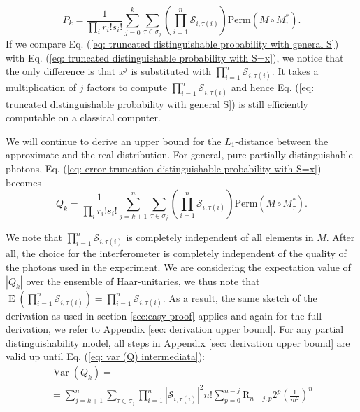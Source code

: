 \documentclass[10pt,aps,pra,twocolumn,superscriptaddress]{revtex4-2}
\DeclareMathOperator{\E}{E}
\DeclareMathOperator{\Var}{Var}
\begin{document}
\begin{equation}
    P_k=\frac{1}{\prod_i r_i! s_i!}\sum_{j=0}^k\sum_{\tau \in \sigma_j}\left(\prod^n_{i=1}\mathcal{S}_{i,\tau(i)}\right) \text{Perm}(M \circ M^*_{\tau}).
    \label{eq: truncated distinguishable probability with general S}
\end{equation}
If we compare Eq. (\ref{eq: truncated distinguishable probability with general S}) with Eq. (\ref{eq: truncated distinguishable probability with S=x}), we notice that the only difference is that $x^j$ is substituted with $\prod^n_{i=1}\mathcal{S}_{i,\tau(i)}$. It takes a multiplication of $j$ factors to compute $\prod^n_{i=1}\mathcal{S}_{i,\tau(i)}$ and hence Eq. (\ref{eq: truncated distinguishable probability with general S}) is still efficiently computable on a classical computer.

We will continue to derive an upper bound for the $L_1$-distance between the approximate and the real distribution.
For general, pure partially distinguishable photons, Eq. (\ref{eq: error truncation distinguishable probability with S=x}) becomes
\begin{equation}
    Q_k=\frac{1}{\prod_i r_i! s_i!}\sum_{j=k+1}^n\sum_{\tau \in \sigma_j}\left(\prod^n_{i=1}\mathcal{S}_{i,\tau(i)}\right) \text{Perm}(M \circ M^*_{\tau}).
    \label{eq: error truncation distinguishable probability with General S}
\end{equation}

We note that $\prod^n_{i=1}\mathcal{S}_{i,\tau(i)}$ is completely independent of all elements in $M$. After all, the choice for the interferometer is completely independent of the quality of the photons used in the experiment. We are considering the expectation value of $|Q_k|$ over the ensemble of Haar-unitaries, we thus note that $\E\left(\prod^n_{i=1}\mathcal{S}_{i,\tau(i)}\right)=\prod^n_{i=1}\mathcal{S}_{i,\tau(i)}$. As a result, the same sketch of the derivation as used in section \ref{sec:easy proof} applies and again for the full derivation, we refer to Appendix \ref{sec: derivation upper bound}. 
For any partial distinguishability model, all steps in Appendix \ref{sec: derivation upper bound} are valid up until Eq. (\ref{eq: var (Q) intermediata}): 
\begin{multline}
    \Var(Q_k)=\\
    =\sum_{j=k+1}^n \sum_{\tau\in\sigma_j}\prod^n_{i=1}|\mathcal{S}_{i,\tau(i)}|^2 n!\sum^{n-j}_{p=0}\mathrm{R}_{n-j,p}2^p\left(\frac{1}{m^2}\right)^{n}
    \label{eq: var intermediate main}
\end{multline}
\end{document}
